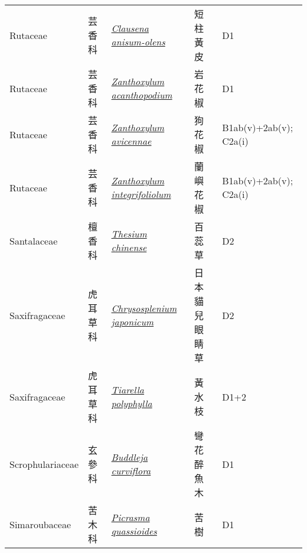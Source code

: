 {\begin{longtable}{L{2.5cm}L{2cm}L{5cm}L{2.5cm}L{3cm}}
    Rutaceae & 芸香科 & \href{http://www.theplantlist.org/tpl1.1/search?q=Clausena+anisum-olens}{\textit{Clausena anisum-olens} } & 短柱黃皮 & D1    \\
    Rutaceae & 芸香科 & \href{http://www.theplantlist.org/tpl1.1/search?q=Zanthoxylum+acanthopodium}{\textit{Zanthoxylum acanthopodium} } & 岩花椒 & D1    \\
    Rutaceae & 芸香科 & \href{http://www.theplantlist.org/tpl1.1/search?q=Zanthoxylum+avicennae}{\textit{Zanthoxylum avicennae} } & 狗花椒 & B1ab(v)+2ab(v); C2a(i)    \\
    Rutaceae & 芸香科 & \href{http://www.theplantlist.org/tpl1.1/search?q=Zanthoxylum+integrifoliolum}{\textit{Zanthoxylum integrifoliolum} } & 蘭嶼花椒 & B1ab(v)+2ab(v); C2a(i)    \\
    Santalaceae & 檀香科 & \href{http://www.theplantlist.org/tpl1.1/search?q=Thesium+chinense}{\textit{Thesium chinense} } & 百蕊草 & D2    \\
    Saxifragaceae & 虎耳草科 & \href{http://www.theplantlist.org/tpl1.1/search?q=Chrysosplenium+japonicum}{\textit{Chrysosplenium japonicum} } & 日本貓兒眼睛草 & D2    \\
    Saxifragaceae & 虎耳草科 & \href{http://www.theplantlist.org/tpl1.1/search?q=Tiarella+polyphylla}{\textit{Tiarella polyphylla} } & 黃水枝 & D1+2    \\
    Scrophulariaceae & 玄參科 & \href{http://www.theplantlist.org/tpl1.1/search?q=Buddleja+curviflora}{\textit{Buddleja curviflora} } & 彎花醉魚木 & D1    \\
    Simaroubaceae & 苦木科 & \href{http://www.theplantlist.org/tpl1.1/search?q=Picrasma+quassioides}{\textit{Picrasma quassioides} } & 苦樹 & D1    \\

\end{longtable}}
